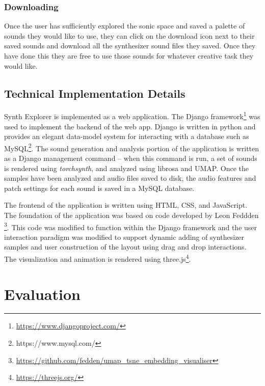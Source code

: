 \subsubsection{Downloading}
Once the user has sufficiently explored the sonic space and saved a palette of sounds they would like to use, they can click on the download icon next to their saved sounds and download all the synthesizer sound files they saved. Once they have done this they are free to use those sounds for whatever creative task they would like.

\subsection{Technical Implementation Details}
Synth Explorer is implemented as a web application. The Django framework\footnote{\url{https://www.djangoproject.com/}} was used to implement the backend of the web app. Django is written in python and provides an elegant data-model system for interacting with a database such as MySQL\footnote{{https://www.mysql.com/}}. The sound generation and analysis portion of the application is written as a Django management command -- when this command is run, a set of sounds is rendered using \textit{torchsynth}, and analyzed using librosa and UMAP. Once the samples have been analyzed and audio files saved to disk, the audio features and patch settings for each sound is saved in a MySQL database.

The frontend of the application is written using HTML, CSS, and JavaScript. The foundation of the application was based on code developed by Leon Feddden \footnote{\url{https://github.com/fedden/umap_tsne_embedding_visualiser}}. This code was modified to function within the Django framework and the user interaction paradigm was modified to support dynamic adding of synthesizer samples and user construction of the layout using drag and drop interactions. The visualization and animation is rendered using three.js\footnote{\url{https://threejs.org/}}.

\section{Evaluation}
